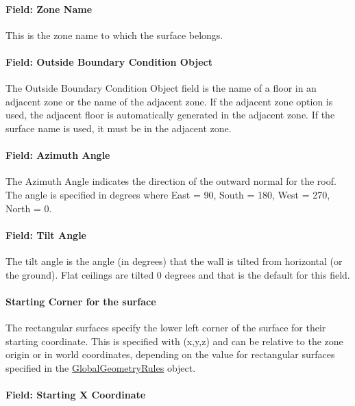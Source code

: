 \paragraph{Field: Zone Name}\label{field-zone-name-6-004}

This is the zone name to which the surface belongs.

\paragraph{Field: Outside Boundary Condition Object}\label{field-outside-boundary-condition-object-1}

The Outside Boundary Condition Object field is the name of a floor in an adjacent zone or the name of the adjacent zone. If the adjacent zone option is used, the adjacent floor is automatically generated in the adjacent zone. If the surface name is used, it must be in the adjacent zone.

\paragraph{Field: Azimuth Angle}\label{field-azimuth-angle-6}

The Azimuth Angle indicates the direction of the outward normal for the roof. The angle is specified in degrees where East = 90, South = 180, West = 270, North = 0.

\paragraph{Field: Tilt Angle}\label{field-tilt-angle-6}

The tilt angle is the angle (in degrees) that the wall is tilted from horizontal (or the ground). Flat ceilings are tilted 0 degrees and that is the default for this field.

\paragraph{Starting Corner for the surface}\label{starting-corner-for-the-surface-6}

The rectangular surfaces specify the lower left corner of the surface for their starting coordinate. This is specified with (x,y,z) and can be relative to the zone origin or in world coordinates, depending on the value for rectangular surfaces specified in the \hyperref[globalgeometryrules]{GlobalGeometryRules} object.

\paragraph{Field: Starting X Coordinate}\label{field-starting-x-coordinate-6}

